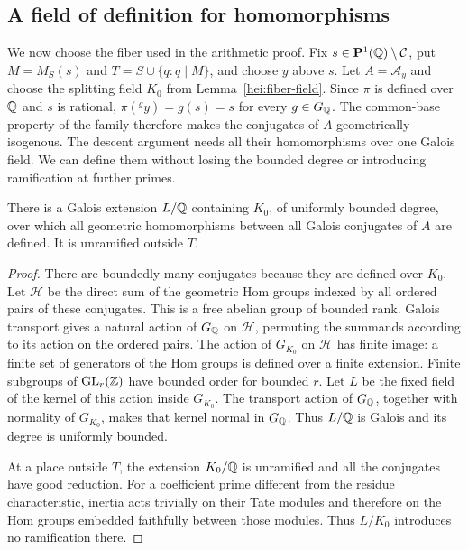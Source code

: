 \subsection{A field of definition for homomorphisms}

We now choose the fiber used in the arithmetic proof.  Fix
$s\in\mathbf P^1(\mathbb Q)\setminus\mathcal C$, put $M=M_S(s)$ and
$T=S\cup\{q:q\mid M\}$, and choose $y$ above $s$.  Let
$A=\mathcal A_y$ and choose the splitting field $K_0$ from
Lemma~\ref{hei:fiber-field}.  Since $\pi$ is defined over $\mathbb Q$ and $s$
is rational, $\pi({}^g y)=g(s)=s$ for every $g\in G_\mathbb Q$.
The common-base property of the family therefore makes the conjugates
of $A$ geometrically isogenous.
The descent argument needs all their homomorphisms over one Galois
field.  We can define them without losing the bounded degree or
introducing ramification at further primes.

\begin{lemma}\label{hei:hom-field}
There is a Galois extension $L/\mathbb Q$ containing $K_0$, of uniformly
bounded degree, over which all geometric homomorphisms between all
Galois conjugates of $A$ are defined.  It is unramified outside $T$.
\end{lemma}

\begin{proof}
There are boundedly many conjugates because they are defined over
$K_0$.  Let $\mathcal H$ be the direct sum of the geometric Hom groups
indexed by all ordered pairs of these conjugates.  This is a free
abelian group of bounded rank.  Galois transport gives a natural
action of $G_\mathbb Q$ on $\mathcal H$, permuting the summands according to
its action on the ordered pairs.  The action of $G_{K_0}$ on $\mathcal H$ has
finite image: a finite set of generators of the Hom groups is defined
over a finite extension.  Finite subgroups of $\mathrm{GL}_r(\mathbb Z)$
have bounded order for bounded $r$.  Let $L$ be the fixed field of
the kernel of this action inside $G_{K_0}$.  The transport action of
$G_\mathbb Q$, together with normality of $G_{K_0}$, makes that kernel normal
in $G_\mathbb Q$.
Thus $L/\mathbb Q$ is Galois and its degree is uniformly bounded.

At a place outside $T$, the extension $K_0/\mathbb Q$ is unramified and all
the conjugates have good reduction.  For a coefficient prime different
from the residue characteristic, inertia acts trivially on their Tate
modules and therefore on the Hom groups embedded faithfully between
those modules.  Thus $L/K_0$ introduces no ramification there.
\end{proof}

